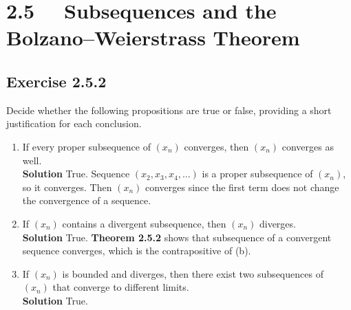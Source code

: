 \documentclass[12pt]{report}
\begin{document}
\section{2.5 ~~Subsequences and the Bolzano–Weierstrass Theorem}
\subsection*{Exercise 2.5.2}
Decide whether the following propositions are true or false, providing a short justification for each conclusion.
\begin{enumerate}[label=(\alph*)]
    \item If every proper subsequence of $(x_n)$ converges, then $(x_n)$ converges as well.\\
    \textbf{Solution} True. Sequence $(x_2,x_3,x_4,\ldots)$ is a proper subsequence of $(x_n)$, so it converges. Then $(x_n)$ converges since the first 
    term does not change the convergence of a sequence.
    \item If $(x_n)$ contains a divergent subsequence, then $(x_n)$ diverges.\\
    \textbf{Solution} True. \textbf{Theorem 2.5.2} shows that subsequence of a convergent sequence converges, which is the contrapositive of (b).
    \item If $(x_n)$ is bounded and diverges, then there exist two subsequences of $(x_n)$
    that converge to different limits.\\
    \textbf{Solution} True. 
\end{enumerate}
\end{document}
